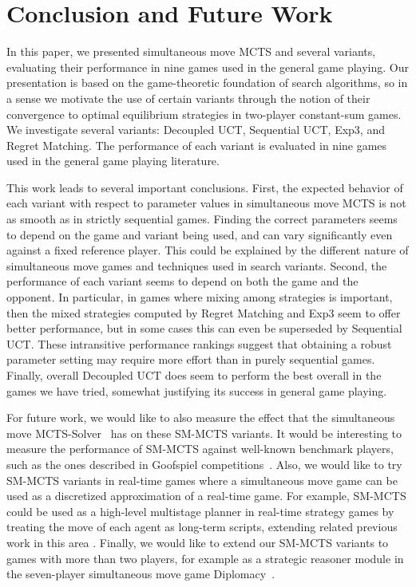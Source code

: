 \documentclass[conference]{IEEEtran}
\begin{document}
\section{Conclusion and Future Work}
\label{sec:conc}

In this paper, we presented simultaneous move MCTS and several variants, evaluating their performance in nine games used in the general game playing. 
Our presentation is based on the game-theoretic foundation of search algorithms, so in a sense we motivate the use of certain variants through 
the notion of their convergence to optimal equilibrium strategies in two-player constant-sum games. 
We investigate several variants: Decoupled UCT, Sequential UCT, Exp3, and Regret Matching. The performance of each variant is evaluated in nine 
games used in the general game playing literature.

This work leads to several important conclusions. First, the expected behavior of each variant with respect to parameter values in simultaneous move MCTS
is not as smooth as in strictly sequential games. Finding the correct parameters seems to depend on the game and variant being used, and can vary 
significantly even against a fixed reference player. This could be explained by the different nature of simultaneous move games and techniques used 
in search variants. Second, the performance of each variant seems to depend on both the game and the opponent. In particular, in games where mixing 
among strategies is important, then the mixed strategies computed by Regret Matching and Exp3 seem to offer better performance, but in some cases this 
can even be superseded by Sequential UCT. These intransitive performance rankings suggest that obtaining a robust parameter setting may require more 
effort than in purely sequential games. Finally, overall Decoupled UCT does seem to perform the best overall in the games we have tried, somewhat 
justifying its success in general game playing. 

For future work, we would like to also measure the effect that the simultaneous move MCTS-Solver~\cite[Chapter 6]{Finnsson12} has on these 
SM-MCTS variants. It would be interesting to measure the performance of SM-MCTS against well-known benchmark players, such as the ones described 
in Goofspiel competitions~\cite{Dror13Repeated}.
Also, we would like to try SM-MCTS variants in real-time games where a simultaneous move game can be used as a discretized approximation 
of a real-time game. For example, SM-MCTS could be used as a high-level multistage planner in real-time strategy games by treating the move of each agent
as long-term scripts, extending related previous work in this area \cite{Sailor07adversarial}. 
Finally, we would like to extend our SM-MCTS variants to games with more than two players, for example as a strategic reasoner 
module in the seven-player simultaneous move game Diplomacy~\cite{Fabregues11DipGame}. 
\end{document}
